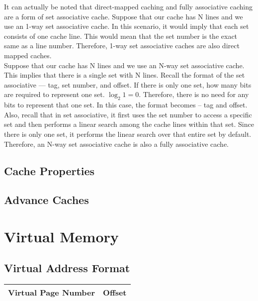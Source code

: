 \documentclass[11pt]{article}
\begin{document}
It can actually be noted that direct-mapped caching and fully associative caching are a form of set associative cache. Suppose that our cache has N lines and we use an 1-way set associative cache. In this scenario, it would imply that each set consists of one cache line. This would mean that the set number is the exact same as a line number. Therefore, 1-way set associative caches are also direct mapped caches.\\

\noindent Suppose that our cache has N lines and we use an N-way set associative cache. This implies that there is a single set with N lines. Recall the format of the set associative --- tag, set number, and offset. If there is only one set, how many bits are required to represent one set. \( \log_2 1 = 0 \). Therefore, there is no need for any bits to represent that one set. In this case, the format becomes -- tag and offset. Also, recall that in set associative, it first uses the set number to access a specific set and then performs a linear search among the cache lines within that set. Since there is only one set, it performs the linear search over that entire set by default. Therefore, an N-way set associative cache is also a fully associative cache.

\subsection{Cache Properties}

\subsection{Advance Caches}

\section{Virtual Memory}

\subsection{Virtual Address Format}

\begin{table}[H]
	\centering
	\begin{tabular}{| c | c |}
		\hline
		Virtual Page Number	&	Offset\\
		\hline
	\end{tabular}
\end{table}
\end{document}
